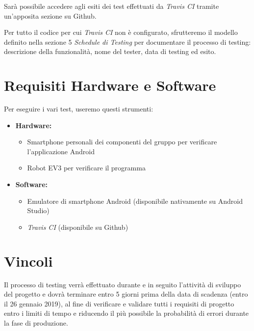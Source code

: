 \documentclass{article}
\begin{document}
Sarà possibile accedere agli esiti dei test effettuati da \emph{Travis
CI} tramite un'apposita sezione su Github.

Per tutto il codice per cui \emph{Travis CI} non è configurato,
sfrutteremo il modello definito nella sezione 5 \emph{Schedule di
Testing} per documentare il processo di testing: descrizione della
funzionalità, nome del tester, data di testing ed esito.

\section{Requisiti Hardware e
Software}

Per eseguire i vari test, useremo questi strumenti:

\begin{itemize}
\item
  \textbf{Hardware:}

  \begin{itemize}
  \item
    Smartphone personali dei componenti del gruppo per verificare
    l'applicazione Android
  \item
    Robot EV3 per verificare il programma
  \end{itemize}
\item
  \textbf{Software:}

  \begin{itemize}
  \item
    Emulatore di smartphone Android (disponibile nativamente su Android
    Studio)
  \item
    \emph{Travis CI} (disponibile su Github)
  \end{itemize}
\end{itemize}

\section{Vincoli}

Il processo di testing verrà effettuato durante e in seguito l'attività
di sviluppo del progetto e dovrà terminare entro 5 giorni prima della
data di scadenza (entro il 26 gennaio 2019), al fine di verificare e
validare tutti i requisiti di progetto entro i limiti di tempo e
riducendo il più possibile la probabilità di errori durante la fase di
produzione.
\end{document}
